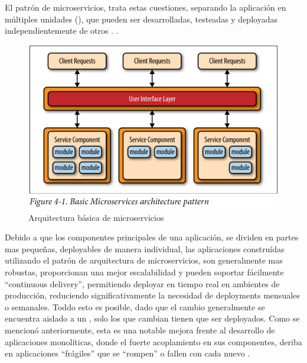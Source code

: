 El patrón de microservicios, trata estas cuestiones, separando la aplicación en múltiples unidades  (), que pueden ser desarrolladas, testeadas y deployadas independientemente de otros . .\cite[p.~27]{richards2015}

\begin{figure}
  \includegraphics[width=\linewidth]{src/images/02-capitulo-2/basic_microservices_arquitecture_pattern.png}
  \caption{Arquitectura básica de microservicios}
  \label{fig:basic_microservices_arquitecture_pattern}
\end{figure}

Debido a que los componentes principales de una aplicación, se dividen en partes mas pequeñas, deployables de manera individual, las aplicaciones construídas utilizando el patrón de arquitectura de microservicios, son generalmente mas robustas, proporcionan una mejor escalabilidad y pueden soportar fácilmente ``continuous delivery'', permitiendo deployar en tiempo real en ambientes de producción, reduciendo significativamente la necesidad de deployments mensuales o semanales.  Toddo esto es posible, dado que el cambio generalmente se encuentra aislado a un , solo los  que cambian tienen que ser deployados.  Como se mencionó anteriormente, esta es una notable mejora frente al desarrollo de aplicaciones monolíticas, donde el fuerte acoplamiento en sus componentes, deriba en aplicaciones ``frágiles'' que se ``rompen'' o fallen con cada nuevo .
